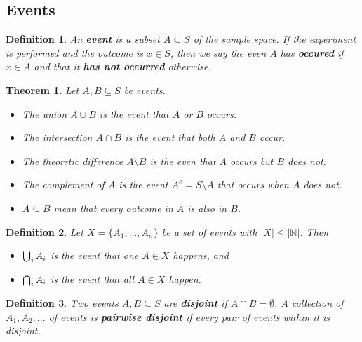 \documentclass{article}
\theoremstyle{sltheorem}
\newtheorem{definition}{Definition}[section]
\newtheorem{theorem}{Theorem}[section]
\newcommand{\N}{\mathbb{N}}
\newcommand{\wbigcup}{\mathop{\bigcup}\displaylimits}
\newcommand{\wbigcap}{\mathop{\bigcap}\displaylimits}
\newcommand*\B[1]{\textbf{#1}}
\begin{document}
\subsection{Events}
\begin{definition}
    An \B{event} is a subset $A\subseteq S$ of the sample space. If the experiment is performed and the
    outcome is $x\in S$, then we say the even $A$ has \B{occured} if $x\in A$ and that it \B{has not occurred}
    otherwise.
\end{definition}
\begin{theorem}
    Let $A,B\subseteq S$ be events.
    \begin{itemize}
        \item The union $A\cup B$ is the event that $A$ or $B$ occurs.
        \item The intersection $A\cap B$ is the event that both $A$ and $B$ occur.
        \item The theoretic difference $A\setminus B$ is the even that $A$ occurs but $B$ does not.
        \item The complement of $A$ is the event $A^c=S\setminus A$ that occurs when $A$ does not.
        \item $A\subseteq B$ mean that every outcome in $A$ is also in $B$.
    \end{itemize}
\end{theorem}
\begin{definition}
    Let $X=\{A_1, ..., A_n\}$ be a set of events with $|X|\leq |\N|$. Then 
    \begin{itemize}
        \item $\wbigcup_i A_i$ is the event that one $A\in X$ happens, and
        \item $\wbigcap_i A_i$ is the event that all $A\in X$ happen.
    \end{itemize}
\end{definition}
\begin{definition}
    Two events $A,B\subseteq S$ are \B{disjoint} if $A\cap B=\emptyset$. 
    A collection of $A_1, A_2,...$ of events is \B{pairwise disjoint} if every pair of
    events within it is disjoint.
\end{definition}
\end{document}
